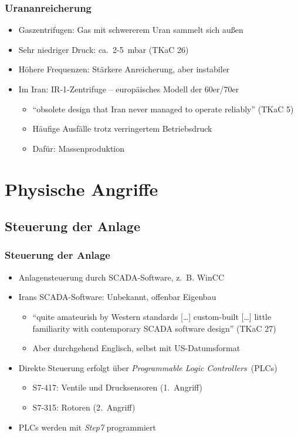 \documentclass{beamer}
\begin{document}
\begin{frame}
  \frametitle{Urananreicherung}
  \begin{itemize}
    \item Gaszentrifugen: Gas mit schwererem Uran sammelt sich außen
    \item Sehr niedriger Druck: ca.~2-5~mbar (TKaC 26)
    \item Höhere Frequenzen: Stärkere Anreicherung, aber instabiler
    \item Im Iran: IR-1-Zentrifuge – europäisches Modell der 60er/70er
      \begin{itemize}
        \item ``obsolete design that Iran never managed to operate reliably'' (TKaC 5)
        \item Häufige Ausfälle trotz verringertem Betriebsdruck
        \item Dafür: Massenproduktion
      \end{itemize}
  \end{itemize}
\end{frame}

\section{Physische Angriffe}

\subsection{Steuerung der Anlage}

\begin{frame}
  \frametitle{Steuerung der Anlage}
  \begin{itemize}
    \item Anlagensteuerung durch SCADA-Software, z.~B. WinCC
    \item Irans SCADA-Software: Unbekannt, offenbar Eigenbau
      \begin{itemize}
        \item ``quite amateurish by Western standards […] custom-built […] little familiarity with contemporary SCADA software design'' (TKaC 27)
        \item Aber durchgehend Englisch, selbst mit US-Datumsformat
      \end{itemize}
    \item Direkte Steuerung erfolgt über \emph{Programmable Logic Controllers}~(PLCs)
      \begin{itemize}
        \item S7-417: Ventile und Drucksensoren (1.~Angriff)
        \item S7-315: Rotoren (2.~Angriff)
      \end{itemize}
    \item PLCs werden mit \emph{Step7} programmiert
  \end{itemize}
\end{frame}
\end{document}
